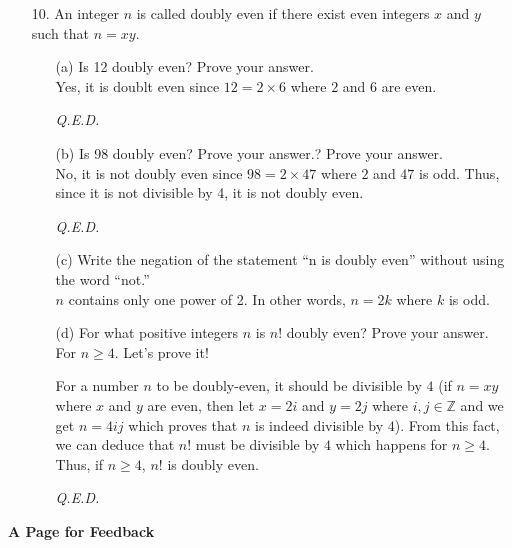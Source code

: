 \documentclass[12pt, a4paper]{article}                  %
\begin{document}
\begin{enumerate}
\item[10.]
An integer $n$ is called doubly even if there exist even integers $x$ and $y$ such that $n = xy$.
\begin{enumerate}
\item[(a)]
Is 12 doubly even? Prove your answer.\\

Yes, it is doublt even since $12 = 2 \times 6$ where $2$ and $6$ are even.
\begin{flushright}
\textit{Q.E.D.}
\end{flushright}
\item[(b)]
Is 98 doubly even? Prove your answer.? Prove your answer.\\

No, it is not doubly even since $98 = 2 \times 47$ where $2$ and $47$ is odd.
Thus, since it is not divisible by 4, it is not doubly even.
\begin{flushright}
\textit{Q.E.D.}
\end{flushright}
\item[(c)]
Write the negation of the statement “n is doubly even” without using the word
“not.”\\

$n$ contains only one power of 2. In other words, $n = 2k$ where $k$ is odd.

\item[(d)]
For what positive integers $n$ is $n!$ doubly even? Prove your answer.\\

For $n \geq 4$. Let's prove it!

For a number $n$ to be doubly-even, it should be divisible by $4$
(if $n = xy$ where $x$ and $y$ are even, then let $x = 2i$ and $y = 2j$
where $i,j \in \mathbb{Z}$ and we get $n = 4ij$ which proves that $n$ is
indeed divisible by $4$). From this fact, we can deduce that $n!$ must
be divisible by $4$ which happens for $n \geq 4$. Thus, if $n \geq 4$, $n!$
is doubly even.
\begin{flushright}
\textit{Q.E.D.}
\end{flushright}
\end{enumerate}
\end{enumerate}

\newpage
\begin{center}
\LARGE{\textbf{A Page for Feedback}}
\end{center}
\end{document}
